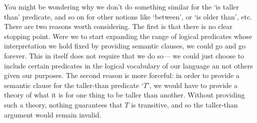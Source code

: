 You might be wondering why we don't do something similar for the `is taller than' predicate, and so on for other notions like `between', or `is older than', etc.
There are two reasons worth considering.
The first is that there is no clear stopping point.
Were we to start expanding the range of logical predicates whose interpretation we hold fixed by providing semantic clauses, we could go and go forever.
This in itself does not require that we do so--- we could just choose to include certain predicates in the logical vocabulary of our language an not others given our purposes.
The second reason is more forceful: in order to provide a semantic clause for the taller-than predicate `$T$', we would have to provide a theory of what it is for one thing to be taller than another.
Without providing such a theory, nothing guarantees that $T$ is transitive, and so the taller-than argument would remain invalid. 

%



